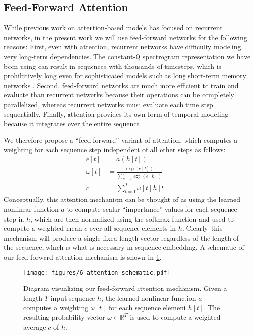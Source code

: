 \subsection{Feed-Forward Attention}
\label{sec:ffattention}

While previous work on attention-based models has focused on recurrent networks, in the present work we will use feed-forward networks for the following reasons:
First, even with attention, recurrent networks have difficulty modeling very long-term dependencies.
The constant-Q spectrogram representation we have been using can result in sequences with thousands of timesteps, which is prohibitively long even for sophisticated models such as long short-term memory networks \cite{hochreiter1997long}.
Second, feed-forward networks are much more efficient to train and evaluate than recurrent networks because their operations can be completely parallelized, whereas recurrent networks must evaluate each time step sequentially.
Finally, attention provides its own form of temporal modeling because it integrates over the entire sequence.

We therefore propose a ``feed-forward'' variant of attention, which computes a weighting for each sequence step independent of all other steps as follows:
\begin{align}
e[t] &= a(h[t])\\
\omega[t] &= \frac{\exp(e[t])}{\sum_{k = 1}^T \exp(e[k])}\\
\label{eq:ffattention}
c &= \sum_{t = 1}^T \omega[t] h[t]
\end{align}
Conceptually, this attention mechanism can be thought of as using the learned nonlinear function $a$ to compute scalar ``importance'' values for each sequence step in $h$, which are then normalized using the softmax function and used to compute a weighted mean $c$ over all sequence elements in $h$.
Clearly, this mechanism will produce a single fixed-length vector regardless of the length of the sequence, which is what is necessary in sequence embedding.
A schematic of our feed-forward attention mechanism is shown in \cref{fig:attention_schematic}.

\begin{figure}
  \texttt{[image: figures/6-attention\_schematic.pdf]}
  \caption[Feed-forward attention mechanism]{Diagram visualizing our feed-forward attention mechanism.
Given a length-$T$ input sequence $h$, the learned nonlinear function $a$ computes a weighting $\omega[t]$ for each sequence element $h[t]$.
The resulting probability vector $\omega \in \mathbb{R}^T$ is used to compute a weighted average $c$ of $h$.}
  \label{fig:attention_schematic}
\end{figure}

